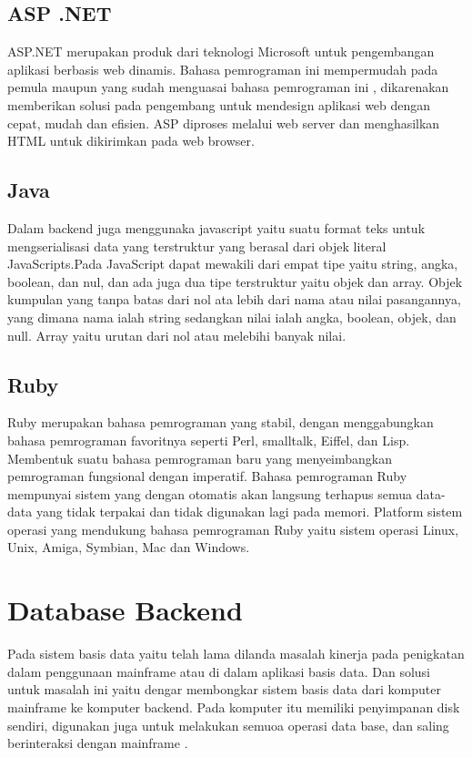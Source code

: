 \subsection{ASP .NET}
	ASP.NET merupakan produk dari teknologi Microsoft untuk pengembangan aplikasi berbasis web dinamis. 
Bahasa pemrograman ini mempermudah pada pemula maupun yang sudah menguasai bahasa pemrograman ini , dikarenakan memberikan solusi pada pengembang untuk mendesign aplikasi web dengan cepat, mudah dan efisien. 
ASP diproses melalui web server dan menghasilkan HTML untuk dikirimkan pada web browser.


\subsection{Java}
	Dalam backend juga menggunaka javascript yaitu suatu format teks untuk mengserialisasi data yang terstruktur yang berasal dari objek literal JavaScripts.Pada JavaScript dapat mewakili dari empat tipe yaitu string, angka, boolean, dan nul, dan ada juga dua tipe terstruktur yaitu objek dan array. Objek kumpulan yang tanpa batas dari nol ata lebih dari nama atau nilai pasangannya, yang dimana nama ialah string sedangkan nilai ialah angka, boolean, objek, dan null. Array yaitu urutan dari nol atau melebihi banyak nilai.

\subsection{Ruby}
	Ruby merupakan bahasa pemrograman yang stabil, dengan menggabungkan bahasa pemrograman favoritnya seperti Perl, smalltalk, Eiffel, dan Lisp.
Membentuk suatu bahasa pemrograman baru yang menyeimbangkan pemrograman fungsional dengan imperatif.
Bahasa pemrograman Ruby mempunyai sistem yang dengan otomatis akan langsung terhapus semua data-data yang tidak terpakai dan tidak digunakan lagi pada memori. 
Platform sistem operasi yang mendukung bahasa pemrograman Ruby yaitu sistem operasi Linux, Unix, Amiga, Symbian, Mac dan Windows.

\section{Database Backend}
	Pada sistem basis data yaitu telah lama dilanda masalah kinerja pada penigkatan dalam penggunaan mainframe atau di dalam aplikasi basis data. Dan solusi untuk masalah ini yaitu dengar membongkar sistem basis data dari komputer mainframe ke komputer backend. Pada komputer itu memiliki penyimpanan disk sendiri, digunakan juga untuk melakukan semuoa operasi data base, dan saling berinteraksi dengan mainframe
\cite{yousefi2008database}.


